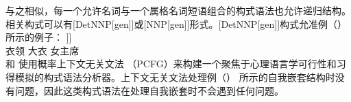 与之相似，每一个允许名词与一个属格名词短语组合的构式语法也允许递归结构。相关构式可以有[DetNNP[gen]]或[NNP[gen]]形式。[DetNNP[gen]]构式允准例（）所示的例子：
\ea
\gll [\sub{NP} des Kragens [\sub{NP} des Mantels [\sub{NP} der Vorsitzenden]]]\\
	{}  衣领 {}  大衣 {}  女主席\\
\z
 \citet{Jurafsky96a}和 \citet*{BLT2009a}使用概率上下文无关文法 （PCFG）来构建一个聚焦于心理语言学可行性和习得模拟的构式语法分析器。上下文无关文法处理例（） 所示的自我嵌套结构时没有问题，因此这类构式语法在处理自我嵌套时不会遇到任何问题。

